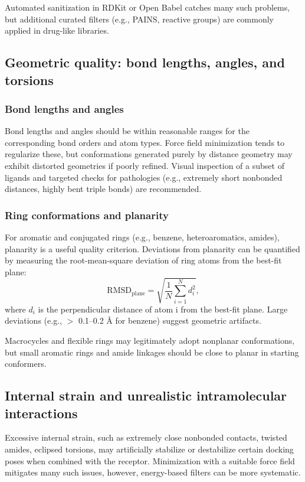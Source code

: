 \documentclass[12pt, a4paper]{article}
\begin{document}
Automated sanitization in RDKit or Open Babel catches many such problems, but additional curated filters (e.g., PAINS, reactive groups) are commonly applied in drug-like libraries.

\subsection{Geometric quality: bond lengths, angles, and torsions}

\subsubsection{Bond lengths and angles}

Bond lengths and angles should be within reasonable ranges for the corresponding bond orders and atom types. Force field minimization tends to regularize these, but conformations generated purely by distance geometry may exhibit distorted geometries if poorly refined.\cite{CH6_Riniker2015} Visual inspection of a subset of ligands and targeted checks for pathologies (e.g., extremely short nonbonded distances, highly bent triple bonds) are recommended.

\subsubsection{Ring conformations and planarity}

For aromatic and conjugated rings (e.g., benzene, heteroaromatics, amides), planarity is a useful quality criterion. Deviations from planarity can be quantified by measuring the root-mean-square deviation of ring atoms from the best-fit plane:
\[
\mathrm{RMSD}_{\mathrm{plane}} = \sqrt{\frac{1}{N} \sum_{i=1}^{N} d_i^2},
\]
where $d_i$ is the perpendicular distance of atom i from the best-fit plane. Large deviations (e.g., $>$ 0.1--0.2 \r{A} for benzene) suggest geometric artifacts.

Macrocycles and flexible rings may legitimately adopt nonplanar conformations, but small aromatic rings and amide linkages should be close to planar in starting conformers.

\subsection{Internal strain and unrealistic intramolecular interactions}

Excessive internal strain, such as extremely close nonbonded contacts, twisted amides, eclipsed torsions, may artificially stabilize or destabilize certain docking poses when combined with the receptor. Minimization with a suitable force field mitigates many such issues, however, energy-based filters can be more systematic.
\end{document}

